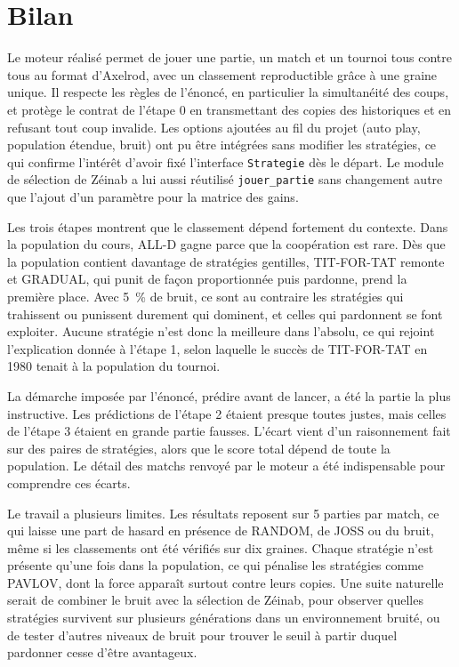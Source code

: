 \documentclass[11pt,a4paper]{article}
\begin{document}
\section{Bilan}
Le moteur réalisé permet de jouer une partie, un match et un tournoi tous contre tous au format d'Axelrod, avec un classement
reproductible grâce à une graine unique. Il respecte les règles de l'énoncé, en particulier la simultanéité des coups, et
protège le contrat de l'étape 0 en transmettant des copies des historiques et en refusant tout coup invalide. Les options
ajoutées au fil du projet (auto play, population étendue, bruit) ont pu être intégrées sans modifier les stratégies, ce qui
confirme l'intérêt d'avoir fixé l'interface \texttt{Strategie} dès le départ. Le module de sélection de Zéinab a lui aussi
réutilisé \texttt{jouer\_partie} sans changement autre que l'ajout d'un paramètre pour la matrice des gains.

Les trois étapes montrent que le classement dépend fortement du contexte. Dans la population du cours, ALL-D gagne parce que
la coopération est rare. Dès que la population contient davantage de stratégies gentilles, TIT-FOR-TAT remonte et GRADUAL,
qui punit de façon proportionnée puis pardonne, prend la première place. Avec 5~\% de bruit, ce sont au contraire les
stratégies qui trahissent ou punissent durement qui dominent, et celles qui pardonnent se font exploiter. Aucune stratégie
n'est donc la meilleure dans l'absolu, ce qui rejoint l'explication donnée à l'étape 1, selon laquelle le succès de
TIT-FOR-TAT en 1980 tenait à la population du tournoi.

La démarche imposée par l'énoncé, prédire avant de lancer, a été la partie la plus instructive. Les prédictions de l'étape 2
étaient presque toutes justes, mais celles de l'étape 3 étaient en grande partie fausses. L'écart vient d'un raisonnement
fait sur des paires de stratégies, alors que le score total dépend de toute la population. Le détail des matchs renvoyé par le
moteur a été indispensable pour comprendre ces écarts.

Le travail a plusieurs limites. Les résultats reposent sur 5 parties par match, ce qui laisse une part de hasard en présence
de RANDOM, de JOSS ou du bruit, même si les classements ont été vérifiés sur dix graines. Chaque stratégie n'est présente
qu'une fois dans la population, ce qui pénalise les stratégies comme PAVLOV, dont la force apparaît surtout contre leurs
copies. Une suite naturelle serait de combiner le bruit avec la sélection de Zéinab, pour observer quelles stratégies
survivent sur plusieurs générations dans un environnement bruité, ou de tester d'autres niveaux de bruit pour trouver le
seuil à partir duquel pardonner cesse d'être avantageux.
\end{document}
